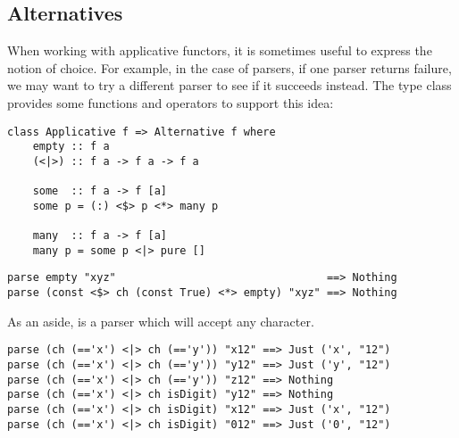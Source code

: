 \taskLine

\subsection{Alternatives}

When working with applicative functors, it is sometimes useful to express the notion of choice. For example, in the case of parsers, if one parser returns failure, we may want to try a different parser to see if it succeeds instead. The  type class provides some functions and operators to support this idea:
\begin{verbatim}
class Applicative f => Alternative f where
    empty :: f a
    (<|>) :: f a -> f a -> f a

    some  :: f a -> f [a]
    some p = (:) <$> p <*> many p

    many  :: f a -> f [a]
    many p = some p <|> pure []
\end{verbatim}

\taskLine

\begin{verbatim}
parse empty "xyz"                                 ==> Nothing
parse (const <$> ch (const True) <*> empty) "xyz" ==> Nothing
\end{verbatim}
As an aside,  is a parser which will accept any character.

\begin{verbatim}
parse (ch (=='x') <|> ch (=='y')) "x12" ==> Just ('x', "12")
parse (ch (=='x') <|> ch (=='y')) "y12" ==> Just ('y', "12")
parse (ch (=='x') <|> ch (=='y')) "z12" ==> Nothing
parse (ch (=='x') <|> ch isDigit) "y12" ==> Nothing
parse (ch (=='x') <|> ch isDigit) "x12" ==> Just ('x', "12")
parse (ch (=='x') <|> ch isDigit) "012" ==> Just ('0', "12")
\end{verbatim}


